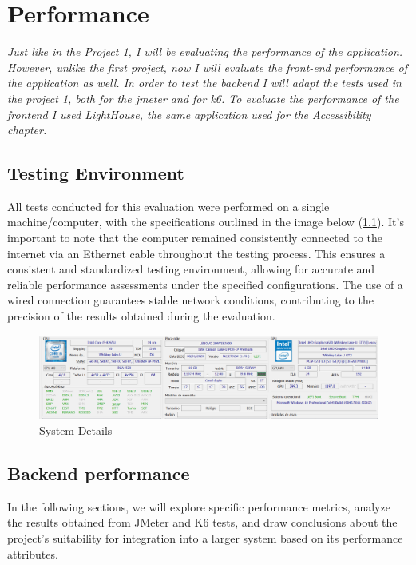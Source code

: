 \documentclass[a4paper,11pt,openright,BCOR=15mm]{scrbook}
\begin{document}
	\chapter{Performance}
\textit{    Just like in the Project 1, I will be evaluating the performance of the application. However, unlike the first project, now I will evaluate the front-end performance of the application as well. In order to test the backend I will adapt the tests used in the project 1, both for the jmeter and for k6. To evaluate the performance of the frontend I used LightHouse, the same application used for the Accessibility chapter.     }		

\section{Testing Environment}
  All tests conducted for this evaluation were performed on a single machine/computer, with the specifications outlined in the image below (\ref{fig:SystemDetails}). It's important to note that the computer remained consistently connected to the internet via an Ethernet cable throughout the testing process. This ensures a consistent and standardized testing environment, allowing for accurate and reliable performance assessments under the specified configurations. The use of a wired connection guarantees stable network conditions, contributing to the precision of the results obtained during the evaluation.
  
  	\begin{figure}[h]
    	\centering
    	\includegraphics[width=\textwidth]{figs/Performance/SystemDetails.png}
    	\caption{System Details}
    	\label{fig:SystemDetails}
  	\end{figure}



\section{Backend performance}
In the following sections, we will explore specific performance metrics, analyze the
results obtained from JMeter and K6 tests, and draw conclusions about the project’s
suitability for integration into a larger system based on its performance attributes.
\end{document}
